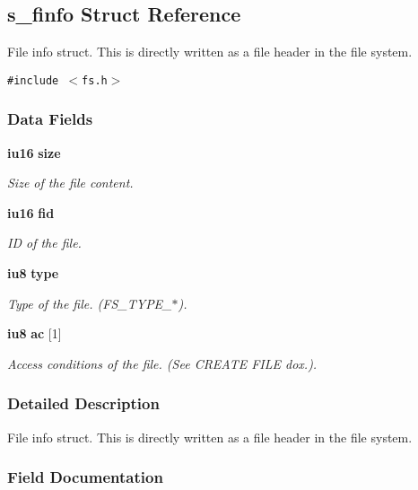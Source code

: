 \subsection{s\_\-finfo Struct Reference}
\label{structs__finfo}
File info struct. This is directly written as a file header in the file system.  


{\tt \#include $<$fs.h$>$}

\subsubsection*{Data Fields}
\begin{CompactItemize}
\item 
{\bf iu16} {\bf size}
\begin{CompactList}\small\item\em Size of the file content. \item\end{CompactList}\item 
{\bf iu16} {\bf fid}
\begin{CompactList}\small\item\em ID of the file. \item\end{CompactList}\item 
{\bf iu8} {\bf type}
\begin{CompactList}\small\item\em Type of the file. (FS\_\-TYPE\_\-$\ast$). \item\end{CompactList}\item 
{\bf iu8} {\bf ac} [1]
\begin{CompactList}\small\item\em Access conditions of the file. (See CREATE FILE dox.). \item\end{CompactList}\end{CompactItemize}


\subsubsection{Detailed Description}
File info struct. This is directly written as a file header in the file system. 



\subsubsection{Field Documentation}
